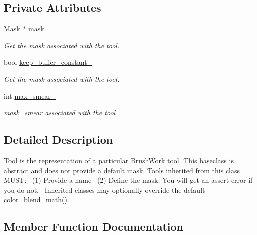 \subsection*{Private Attributes}
\begin{DoxyCompactItemize}
\item 
\hyperlink{classimage__tools_1_1Mask}{Mask} $\ast$ \hyperlink{classimage__tools_1_1Tool_a318a254280db4cc65ab7e185b1c41db4}{mask\+\_\+}
\begin{DoxyCompactList}\small\item\em Get the mask associated with the tool. \end{DoxyCompactList}\item 
bool \hyperlink{classimage__tools_1_1Tool_acbe9c5c5e9f8dca610e5f00ceb2165cb}{keep\+\_\+buffer\+\_\+constant\+\_\+}
\begin{DoxyCompactList}\small\item\em Get the mask associated with the tool. \end{DoxyCompactList}\item 
int \hyperlink{classimage__tools_1_1Tool_a302c8f65693346d76d026d4306ce293e}{max\+\_\+smear\+\_\+}
\begin{DoxyCompactList}\small\item\em mask\+\_\+smear associated with the tool \end{DoxyCompactList}\end{DoxyCompactItemize}


\subsection{Detailed Description}
\hyperlink{classimage__tools_1_1Tool}{Tool} is the representation of a particular Brush\+Work tool. This baseclass is abstract and does not provide a default mask. Tools inherited from this class M\+U\+ST\+:~\newline
(1) Provide a name~\newline
(2) Define the mask. You will get an assert error if you do not.~\newline
Inherited classes may optionally override the default \hyperlink{classimage__tools_1_1Tool_adca00cc3d94a4ca7bdf15d323754e105}{color\+\_\+blend\+\_\+math()}. 

\subsection{Member Function Documentation}
